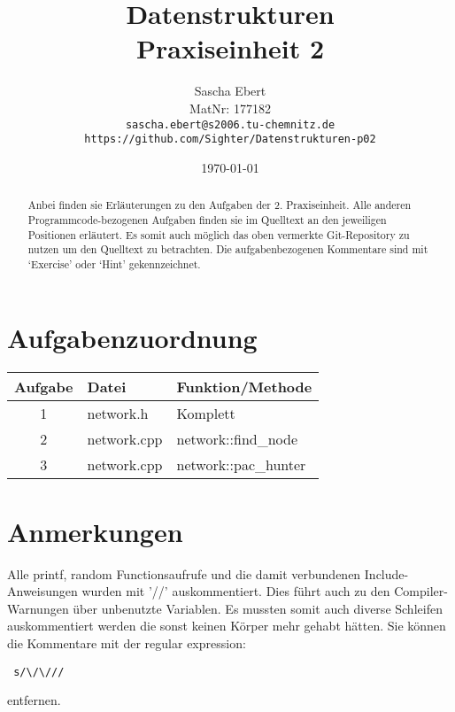\documentclass{article}
\title{Datenstrukturen\\Praxiseinheit 2}
\author
{
	Sascha Ebert\\
	MatNr: 177182\\
	\texttt{sascha.ebert@s2006.tu-chemnitz.de}\\
	\texttt{https://github.com/Sighter/Datenstrukturen-p02}\\
}
\date{\today}
\begin{document}
\maketitle

\begin{abstract}
Anbei finden sie Erläuterungen zu den Aufgaben der 2. Praxiseinheit.
Alle anderen Programmcode-bezogenen Aufgaben finden sie im Quelltext an den jeweiligen Positionen
erläutert. Es somit auch möglich das oben vermerkte Git-Repository zu nutzen um den Quelltext
zu betrachten. Die aufgabenbezogenen Kommentare sind mit `Exercise' oder `Hint' gekennzeichnet.
\end{abstract}

\section*{Aufgabenzuordnung}
\begin{tabular}{ c l l }
  Aufgabe & Datei & Funktion/Methode\\
  \hline
  1  & network.h & Komplett\\
  2  & network.cpp & network::find\_node\\
  3  & network.cpp & network::pac\_hunter\\
\end{tabular}

\section*{Anmerkungen}
Alle printf, random Functionsaufrufe und die damit verbundenen Include-Anweisungen wurden
mit '//' auskommentiert. Dies führt auch zu den Compiler-Warnungen über unbenutzte Variablen.
Es mussten somit auch diverse Schleifen auskommentiert werden die sonst keinen Körper mehr gehabt hätten.
Sie können die Kommentare mit der regular expression: \begin{verbatim} s/\/\/// \end{verbatim} entfernen.
\end{document}
